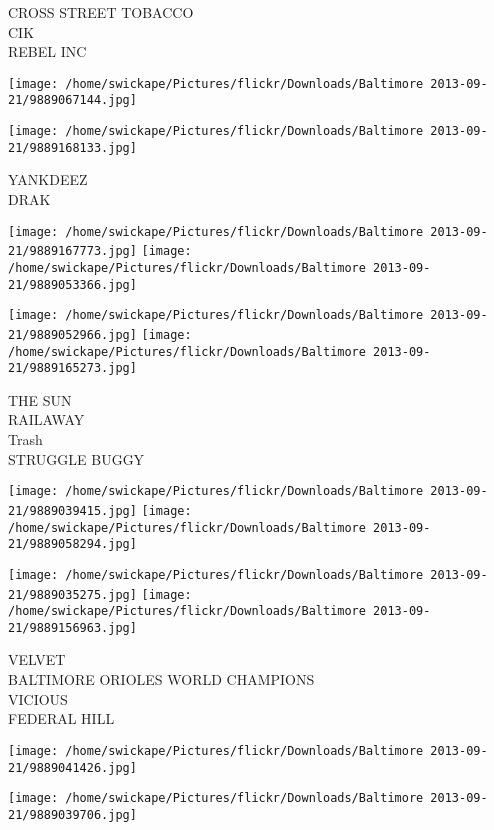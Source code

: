 \documentclass[10pt,letterpaper]{article}
\begin{document}
CROSS STREET TOBACCO\\
CIK\\
REBEL INC\\
\pagebreak

\texttt{[image: /home/swickape/Pictures/flickr/Downloads/Baltimore 2013-09-21/9889067144.jpg]}

\vspace{0.25in}
\texttt{[image: /home/swickape/Pictures/flickr/Downloads/Baltimore 2013-09-21/9889168133.jpg]}

YANKDEEZ\\
DRAK\\
\pagebreak

\texttt{[image: /home/swickape/Pictures/flickr/Downloads/Baltimore 2013-09-21/9889167773.jpg]}
\texttt{[image: /home/swickape/Pictures/flickr/Downloads/Baltimore 2013-09-21/9889053366.jpg]}

\texttt{[image: /home/swickape/Pictures/flickr/Downloads/Baltimore 2013-09-21/9889052966.jpg]}
\texttt{[image: /home/swickape/Pictures/flickr/Downloads/Baltimore 2013-09-21/9889165273.jpg]}

THE SUN\\
RAILAWAY\\
Trash\\
STRUGGLE BUGGY\\
\pagebreak

\texttt{[image: /home/swickape/Pictures/flickr/Downloads/Baltimore 2013-09-21/9889039415.jpg]}
\texttt{[image: /home/swickape/Pictures/flickr/Downloads/Baltimore 2013-09-21/9889058294.jpg]}

\texttt{[image: /home/swickape/Pictures/flickr/Downloads/Baltimore 2013-09-21/9889035275.jpg]}
\texttt{[image: /home/swickape/Pictures/flickr/Downloads/Baltimore 2013-09-21/9889156963.jpg]}

VELVET\\
BALTIMORE ORIOLES WORLD CHAMPIONS\\
VICIOUS\\
FEDERAL HILL\\
\pagebreak

\texttt{[image: /home/swickape/Pictures/flickr/Downloads/Baltimore 2013-09-21/9889041426.jpg]}

\vspace{0.25in}
\texttt{[image: /home/swickape/Pictures/flickr/Downloads/Baltimore 2013-09-21/9889039706.jpg]}
\end{document}
